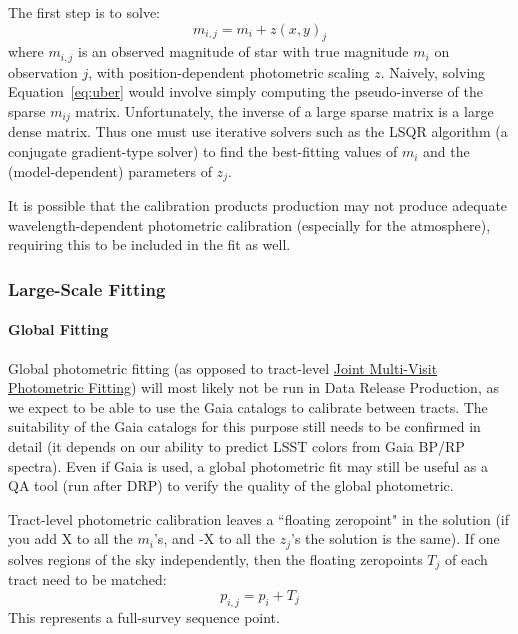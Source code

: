 The first step is to solve:
\begin{equation} \label{eq:uber}
m_{i,j} = m_i + z(x, y)_j
\end{equation}
where $m_{i,j}$ is an observed magnitude of star with true magnitude $m_i$ on observation $j$, with position-dependent photometric scaling $z$.   Naively, solving Equation~\ref{eq:uber} would involve simply computing the pseudo-inverse of the sparse $m_{ij}$ matrix. Unfortunately, the inverse of a large sparse matrix is a large dense matrix.  Thus one must use iterative solvers such as the LSQR algorithm (a conjugate gradient-type solver) to find the best-fitting values of $m_i$ and the (model-dependent) parameters of $z_j$.

It is possible that the calibration products production may not produce adequate wavelength-dependent photometric calibration (especially for the atmosphere), requiring this to be included in the fit as well.

\subsubsection{Large-Scale Fitting}

\paragraph{Global Fitting}
\label{sec:acGlobalPhotometricFit}

Global photometric fitting (as opposed to tract-level \hyperref[sec:acJointPhotometricFit]{Joint Multi-Visit Photometric Fitting}) will most likely not be run in Data Release Production, as we expect to be able to use the Gaia catalogs to calibrate between tracts.  The suitability of the Gaia catalogs for this purpose still needs to be confirmed in detail (it depends on our ability to predict LSST colors from Gaia BP/RP spectra).  Even if Gaia is used, a global photometric fit may still be useful as a QA tool (run after DRP) to verify the quality of the global photometric.

Tract-level photometric calibration leaves a ``floating zeropoint" in the solution (if you add X to all the $m_i$'s, and -X to all the $z_j$'s the solution is the same).  If one solves regions of the sky independently, then the floating zeropoints $T_j$ of each tract need to be matched:
\begin{equation}
p_{i,j} = p_i + T_j
\end{equation}
This represents a full-survey sequence point.

